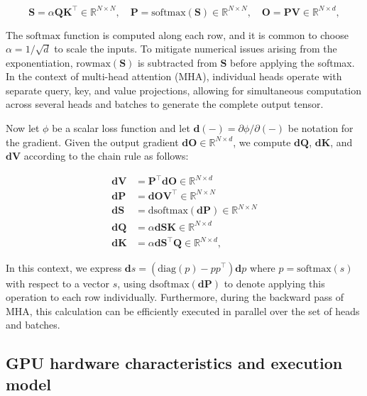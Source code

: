 \begin{equation*}
  \mathbf{S} = \alpha \mathbf{Q} \mathbf{K}^\top \in \mathbb{R}^{N \times N}, \quad \mathbf{P} = \mathrm{softmax}(\mathbf{S}) \in \mathbb{R}^{N \times N}, \quad \mathbf{O} = \mathbf{P}\mathbf{V} \in \mathbb{R}^{N \times d},
\end{equation*}

The $\mathrm{softmax}$ function is computed along each row, and it is common to choose $\alpha = 1/\sqrt{d}$ to scale the inputs. To mitigate numerical issues arising from the exponentiation, $\mathrm{rowmax}(\mathbf{S})$ is subtracted from $\mathbf{S}$ before applying the softmax. In the context of multi-head attention (MHA), individual heads operate with separate query, key, and value projections, allowing for simultaneous computation across several heads and batches to generate the complete output tensor.

Now let $\phi$ be a scalar loss function and let $\mathbf{d}(-) = \partial \phi / \partial (-)$ be notation for the gradient. Given the output gradient $\mathbf{dO} \in \mathbb{R}^{N \times d}$, we compute $\mathbf{dQ}$, $\mathbf{dK}$, and $\mathbf{dV}$ according to the chain rule as follows:

\begin{align*}
  \mathbf{dV} &= \mathbf{P}^\top \mathbf{dO} \in \mathbb{R}^{N \times d} \\
  \mathbf{dP} &= \mathbf{dO} \mathbf{V}^\top \in \mathbb{R}^{N \times N} \\
  \mathbf{dS} &= \mathrm{dsoftmax} (\mathbf{dP}) \in \mathbb{R}^{N \times N} \\
  \mathbf{dQ} &= \alpha \mathbf{dS} \mathbf{K} \in \mathbb{R}^{N \times d} \\
  \mathbf{dK} &= \alpha \mathbf{dS}^\top \mathbf{Q} \in \mathbb{R}^{N \times d},
\end{align*}

In this context, we express $\mathbf{d}s = (\mathrm{diag}(p) - p p^\top)\mathbf{d}p$ where $p = \mathrm{softmax}(s)$ with respect to a vector $s$, using $\mathrm{dsoftmax}(\mathbf{dP})$ to denote applying this operation to each row individually. Furthermore, during the backward pass of MHA, this calculation can be efficiently executed in parallel over the set of heads and batches.

\subsection{GPU hardware characteristics and execution model}
\label{subsec:hardware}

